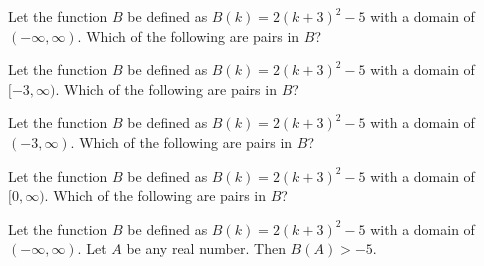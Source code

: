 \documentclass{ximera}
\begin{document}
\begin{exercise}
Let the function $B$ be defined as $B(k) = 2(k+3)^2 - 5$ with a domain of $(-\infty, \infty)$. Which of the following are pairs in $B$?

\begin{selectAll}
\end{selectAll}

\end{exercise}





\begin{exercise}
Let the function $B$ be defined as $B(k) = 2(k+3)^2 - 5$ with a domain of $[-3, \infty)$. Which of the following are pairs in $B$?

\begin{selectAll}
\end{selectAll}

\end{exercise}



\begin{exercise}
Let the function $B$ be defined as $B(k) = 2(k+3)^2 - 5$ with a domain of $(-3, \infty)$. Which of the following are pairs in $B$?

\begin{selectAll}
\end{selectAll}

\end{exercise}




\begin{exercise}
Let the function $B$ be defined as $B(k) = 2(k+3)^2 - 5$ with a domain of $[0, \infty)$. Which of the following are pairs in $B$?

\begin{selectAll}
\end{selectAll}

\end{exercise}





\begin{exercise}
Let the function $B$ be defined as $B(k) = 2(k+3)^2 - 5$ with a domain of $(-\infty, \infty)$. Let $A$ be any real number. Then $B(A) > -5$.



\begin{multipleChoice}
\end{multipleChoice}

\end{exercise}
\end{document}

